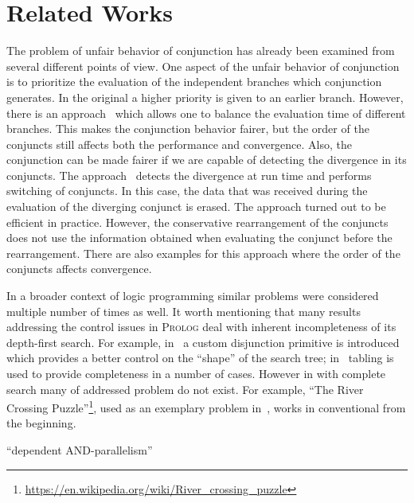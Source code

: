 \section{Related Works}
\label{sec:related}

The problem of unfair behavior of conjunction has already been examined from several different points of view. One aspect of the unfair behavior of conjunction is to prioritize the
evaluation of the independent branches which conjunction generates. In the original \mk a higher priority is given to an earlier branch. However, there is an approach~\cite{fair:towardsAM}
which allows one to balance the evaluation time of different branches. This makes the conjunction behavior fairer, but the order of the conjuncts still affects both the performance and convergence.
Also, the conjunction can be made fairer if we are capable of detecting the divergence in its conjuncts. The approach~\cite{fair:DivTest} detects the divergence at run time and
performs switching of conjuncts. In this case, the data that was received during the evaluation of the diverging conjunct is erased. The approach turned out to be efficient in practice.
However, the conservative rearrangement of the conjuncts does not use the information obtained when evaluating the conjunct before the rearrangement. There are also examples for
this approach where the order of the conjuncts affects convergence.

In a broader context of logic programming similar problems were considered multiple number of times as well. It worth mentioning that many results addressing the control
issues in \textsc{Prolog} deal with inherent incompleteness of its depth-first search. For example, in~\cite{Schrijvers2012TorES} a custom disjunction primitive is
introduced which provides a better control on the ``shape'' of the search tree; in~\cite{OLDresolution} tabling is used to provide completeness in a number of cases.
However in \mk with complete search many of addressed problem do not exist. For example, ``The River Crossing Puzzle''\footnote{\url{https://en.wikipedia.org/wiki/River_crossing_puzzle}},
used as an exemplary problem in~\cite{Schrijvers2012TorES}, works in conventional \mk from the beginning.

``dependent AND-parallelism''~\cite{Parallel}

